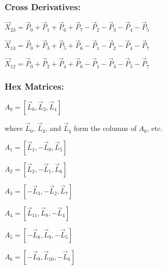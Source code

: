 \documentclass[12pt]{article}
\begin{document}
\subsubsection*{Cross Derivatives:}

\begin{center}
$\vec X_{23} = \vec P_0 + \vec P_1 + \vec P_6 + \vec P_7 
          - \vec P_2 - \vec P_3 - \vec P_4 - \vec P_5$
\end{center}

\begin{center}
$\vec X_{13} = \vec P_0 + \vec P_3 + \vec P_5 + \vec P_6 
          - \vec P_1 - \vec P_2 - \vec P_4 - \vec P_7$
\end{center}

\begin{center}
$\vec X_{12}= \vec P_0 + \vec P_2 + \vec P_4 + \vec P_6 
          - \vec P_1 - \vec P_3 - \vec P_5 - \vec P_7$
\end{center}

\subsubsection*{Hex Matrices:}

\begin{center}
$A_0 = [ \vec L_0, \vec L_3, \vec L_4 ]$
\end{center}

where $\vec L_0$, $\vec L_3$, and $\vec L_4$ form the columns of $A_0$, etc.

\begin{center}
$A_1 = [ \vec L_1, -\vec L_0, \vec L_5 ]$
\end{center}

\begin{center}
$A_2 = [ \vec L_2, -\vec L_1, \vec L_6 ]$
\end{center}

\begin{center}
$A_3 = [ -\vec L_3, -\vec L_2, \vec L_7 ]$
\end{center}

\begin{center}
$A_4 = [ \vec L_{11}, \vec L_8, -\vec L_4 ]$
\end{center}

\begin{center}
$A_5 = [ -\vec L_8, \vec L_9, -\vec L_5 ]$
\end{center}

\begin{center}
$A_6 = [ -\vec L_9, \vec L_{10}, -\vec L_6 ]$
\end{center}
\end{document}
